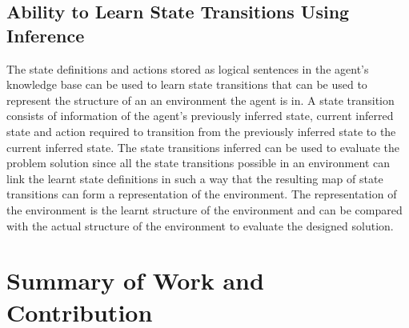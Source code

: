 
\subsection{Ability to Learn State Transitions Using Inference}

The state definitions and actions stored as logical sentences in the agent's knowledge base can be used to learn state transitions that can be used to represent the structure of an an environment the agent is in. A state transition consists of information of the agent's previously inferred state, current inferred state and action required to transition from the previously inferred state to the current inferred state. The state transitions inferred can be used to evaluate the problem solution since all the state transitions possible in an environment can link the learnt state definitions in such a way that the resulting map of state transitions can form a representation of the environment. The representation of the environment is the learnt structure of the environment and can be compared with the actual structure of the environment to evaluate the designed solution.




\section{Summary of Work and Contribution}

